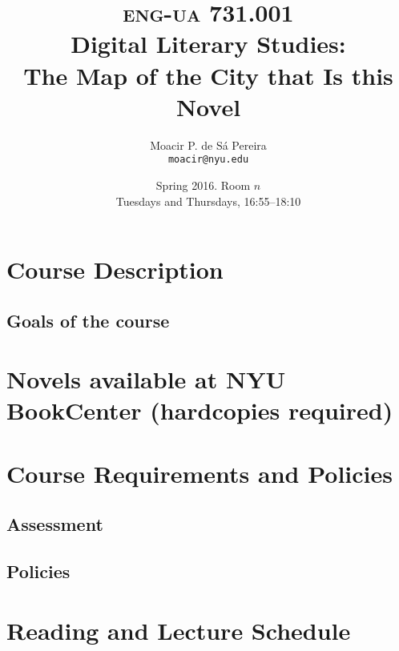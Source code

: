 \documentclass[11pt,article,oneside]{memoir}
\makeatletter
\def\myauthor{Author}
\def\mytitle{Title}
\def\myaddress{}
\def\myemail{}
\def\mycoursecode{}
\def\mycoursename{}
\def\myterm{}
\def\mycoursecode{eng-ua 731.001}
\def\mycoursename{Digital Literary Studies:\\ The Map of the City that Is this Novel}
\def\myterm{Spring 2016}
\def\myaddress{Room $n$}
\def\myemail{moacir@nyu.edu}
\def\myauthor{Moacir P. de Sá Pereira}
\def\mytitle{{\normalsize \textsc{\mycoursecode}\\} \HUGE \mycoursename}
\makeatother
\begin{document}
 \setsansfont[Mapping=tex-text]{Helvetica} 
 \setmonofont[Mapping=tex-text,Scale=0.8]{DejaVu Sans Mono}
 


\def\ind{\hangindent=1 true cm\hangafter=1 \noindent}


\title{\LARGE \mytitle}     
\author{\Large\myauthor\\ \footnotesize\texttt{\noindent\myemail}}
\date{\myterm. \myaddress \\ Tuesdays and Thursdays, 16:55--18:10}

\maketitle

%
%

\section*{Course Description}



\subsection*{Goals of the course}

     
\section*{Novels available at NYU BookCenter \small (hardcopies required)}


	
\section*{Course Requirements and Policies}

  \subsection*{Assessment}
  

	\subsection*{Policies}
	

\newpage

\section*{Reading and Lecture Schedule}


\newpage



\end{document}
